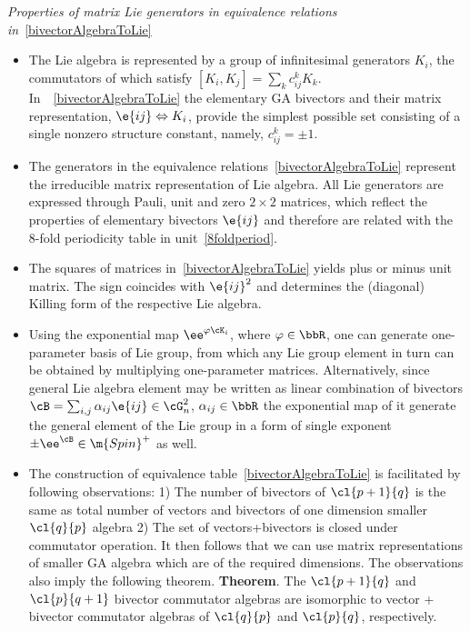 \begin{unit}\textit{Properties of matrix Lie generators in equivalence relations in}~\ref{bivectorAlgebraToLie}
%
\begin{itemize}

%
\item[$\bullet$]  The Lie algebra is represented by a group of
infinitesimal generators $K_i$, the commutators of which satisfy
$[K_i,K_j]=\sum_k c_{ij}^k K_k$. In~~\ref{bivectorAlgebraToLie}
the elementary GA bivectors and their matrix representation,
$\e{ij}\Leftrightarrow K_i$, provide the simplest possible set
consisting of a single nonzero structure constant,
namely,  $c_{ij}^k=\pm 1$. \\
%
\item[$\bullet$]  The generators in the equivalence
relations~\ref{bivectorAlgebraToLie} represent the irreducible
matrix representation of Lie algebra. All Lie  generators are
expressed through Pauli, unit and zero $2\times 2$ matrices, which
reflect the properties of  elementary bivectors $\e{ij}$ and
therefore are related with the 8-fold periodicity table in
unit~\ref{8foldperiod}.\\
%
\item[$\bullet$] The squares of matrices
in~\ref{bivectorAlgebraToLie} yields plus or minus unit
matrix. The sign  coincides with $\e{ij}^2$ and determines  the (diagonal) 
Killing form  of the respective Lie algebra.\\
%
\item[$\bullet$] Using the exponential map $\ee^{\varphi\cK_i}$,
where $\varphi\in\bbR$, one can generate one-parameter basis of Lie group, from which any Lie group element in turn can be obtained by multiplying one-parameter matrices. Alternatively, since general Lie algebra element may be written as linear combination of bivectors $\cB=\sum_{i,j}\alpha_{ij}\e{ij}\in\cG_n^2$, $\alpha_{ij}\in\bbR$ the exponential map of it generate the general element of the Lie group in a form of single exponent 
$\pm\ee^{\cB}\in\m{Spin}^{+}$ as well.\\
%
\item[$\bullet$] The construction of equivalence
table~\ref{bivectorAlgebraToLie} is facilitated by following
observations: 1) The number of bivectors of $\cl{p+1}{q}$ is the same as total number of vectors and bivectors of one dimension smaller $\cl{q}{p}$ algebra 2) The set of vectors+bivectors is closed under commutator operation. It then follows that we can use matrix representations of smaller GA algebra which are of the required dimensions. The observations also imply the following theorem.
\newline \textbf{Theorem}. The $\cl{p+1}{q}$  and $\cl{p}{q+1}$  bivector commutator algebras are isomorphic to vector + bivector commutator algebras of $\cl{q}{p}$ and $\cl{p}{q}$, respectively.


\end{itemize}
\end{unit}
